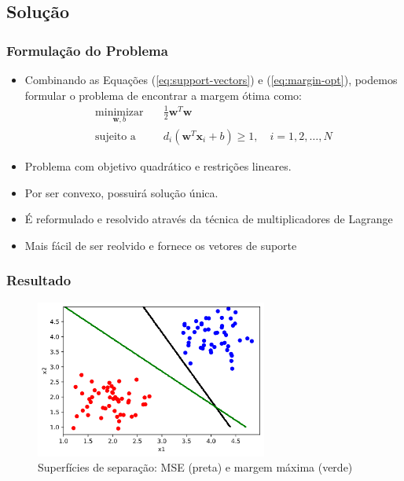 \documentclass{beamer}
\begin{document}
%
%


\subsection{Solução}

\begin{frame}
	\frametitle{Formulação do Problema}
	\begin{itemize}
		\item Combinando as Equações (\ref{eq:support-vectors}) e (\ref{eq:margin-opt}), podemos formular o problema de encontrar a margem ótima como:
		\begin{align}
			\underset{\textbf{w},b}{\text{minimizar}} \quad & \frac{1}{2}\textbf{w}^T\textbf{w} \\ 
			\text{sujeito a} \quad & d_i(\textbf{w}^T\textbf{x}_i + b) \geq 1, \quad i=1,2,\dots,N  \nonumber
			\label{eq:opt-prob1}
		\end{align} 
		\item Problema com objetivo quadrático e restrições lineares. 
		\item Por ser convexo, possuirá solução única.
		\item É reformulado e resolvido através da técnica de multiplicadores de Lagrange \cite{haykin}
		\item Mais fácil de ser reolvido e fornece os vetores de suporte
		
	\end{itemize}
	
\end{frame}

\begin{frame}
	\frametitle{Resultado}
	\begin{figure}[h!]
		\centering
		\includegraphics[width=3in]{fig02.png}
		\caption{Superfícies de separação: MSE (preta) e margem máxima (verde)}
		\label{fig:opt-margin-ds}
	\end{figure}
\end{frame}
\end{document}
